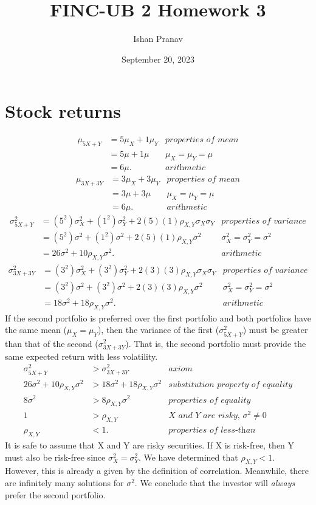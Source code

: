 \documentclass[12pt]{article}
\title{FINC-UB 2 Homework 3}
\author{Ishan Pranav}
\date{September 20, 2023}
\begin{document}
\maketitle
\section{Stock returns}
\begin{align*}
\mu_{5X+Y}
&=5\mu_X+1\mu_Y&\textit{properties of mean}\\
&=5\mu+1\mu&\textit{$\mu_X=\mu_Y=\mu$}\\
&=6\mu.&\textit{arithmetic}
\end{align*}
\begin{align*}
\mu_{3X+3Y}
&=3\mu_X+3\mu_Y&\textit{properties of mean}\\
&=3\mu+3\mu&\textit{$\mu_X=\mu_Y=\mu$}\\
&=6\mu.&\textit{arithmetic}
\end{align*}
\begin{align*}
\sigma_{5X+Y}^2
&=(5^2)\sigma_X^2+(1^2)\sigma_Y^2+2(5)(1)\rho_{X,Y}\sigma_X\sigma_Y&\textit{properties of variance}\\
&=(5^2)\sigma^2+(1^2)\sigma^2+2(5)(1)\rho_{X,Y}\sigma^2&\textit{$\sigma_X^2=\sigma_Y^2=\sigma^2$}\\
&=26\sigma^2+10\rho_{X,Y}\sigma^2.&\textit{arithmetic}
\end{align*}
\begin{align*}
\sigma_{3X+3Y}^2
&=(3^2)\sigma_X^2+(3^2)\sigma_Y^2+2(3)(3)\rho_{X,Y}\sigma_X\sigma_Y&\textit{properties of variance}\\
&=(3^2)\sigma^2+(3^2)\sigma^2+2(3)(3)\rho_{X,Y}\sigma^2&\textit{$\sigma_X^2=\sigma_Y^2=\sigma^2$}\\
&=18\sigma^2+18\rho_{X,Y}\sigma^2.&\textit{arithmetic}
\end{align*}
If the second portfolio is preferred over the first portfolio and both portfolios have the same mean ($\mu_X=\mu_Y$), then the variance of the first ($\sigma_{5X+Y}^2$) must be greater than that of the second ($\sigma_{3X+3Y}^2$). That is, the second portfolio must provide the same expected return with less volatility.
\begin{align*}
\sigma_{5X+Y}^2&>\sigma_{3X+3Y}^2&\textit{axiom}\\
26\sigma^2+10\rho_{X,Y}\sigma^2&>18\sigma^2+18\rho_{X,Y}\sigma^2&\textit{substitution property of equality}\\
8\sigma^2&>8\rho_{X,Y}\sigma^2&\textit{properties of equality}\\
1&>\rho_{X,Y}&\textit{X and Y are risky, $\sigma^2\neq 0$}\\
\rho_{X,Y}&<1.&\textit{properties of less-than}
\end{align*}
It is safe to assume that X and Y are risky securities. If X is risk-free, then Y must also be risk-free since $\sigma_X^2=\sigma_Y^2$. We have determined that $\rho_{X,Y}<1$. However, this is already a given by the definition of correlation. Meanwhile, there are infinitely many solutions for $\sigma^2$. We conclude that the investor will \textit{always} prefer the second portfolio.
\end{document}
